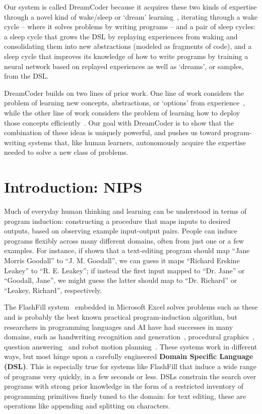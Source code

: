 \documentclass{article}
\begin{document}
Our system is called DreamCoder because it acquires these two kinds of
expertise through a novel kind of wake/sleep or `dream'
learning~\cite{hinton1995wake}, iterating through a wake cycle --
where it solves problems by writing programs -- and a pair of sleep
cycles: a sleep cycle that grows the DSL by replaying experiences from
waking and consolidating them into new abstractions (modeled as
fragments of code), and a sleep cycle that improves its knowledge of
how to write programs by training a neural network based on replayed
experiences as well as `dreams', or samples, from the DSL.

DreamCoder builds on two lines of prior work.  One line of work
considers the problem of learning new concepts, abstractions, or
`options' from
experience~\cite{Dechter:2013:BLV:2540128.2540316,DBLP:conf/icml/LiangJK10,solomonoff1989system,DBLP:journals/corr/abs-1110-5667,stolle2002learning},
while the other line of work considers the problem of learning how to
deploy those concepts
efficiently~\cite{devlin2017robustfill,balog2016deepcoder,NGDS}.  Our
goal with DreamCoder is to show that the combination of these ideas is
uniquely powerful, and pushes us toward program-writing systems that,
like human learners, autonomously acquire the expertise needed to
solve a new class of problems.



\section{Introduction: NIPS}


Much of everyday human thinking and learning can be understood in
terms of program induction: constructing a procedure that maps inputs
to desired outputs, based on observing example input-output pairs.
People can induce programs flexibly across many different domains,
often from just one or a few examples.  For instance, if shown that a
text-editing program should map ``Jane Morris Goodall'' to
``J. M. Goodall'', we can guess it maps ``Richard Erskine Leakey'' to
``R. E. Leakey''; if instead the first input mapped to ``Dr. Jane'' or
``Goodall, Jane'', we might guess the latter should map to
``Dr. Richard'' or ``Leakey, Richard'', respectively.

The FlashFill system~\cite{gulwani2011automating} embedded in
Microsoft Excel solves problems such as these and is probably the best
known practical program-induction algorithm, but researchers in
programming languages and AI have had successes in many domains, such as handwriting recognition and
generation~\cite{lake2015human}, procedural
graphics~\cite{ellis2017learning,DBLP:journals/corr/abs-1804-01118}, question
answering~\cite{johnson2017clevr} and robot motion
planning~\cite{devlin2017neural}.  These systems
work in different ways, but most hinge upon a carefully engineered
\textbf{Domain Specific Language (DSL)}.  This is especially true for
systems like FlashFill that induce a wide range of programs
very quickly, in a few seconds or less.  DSLs constrain the search
over programs with strong prior knowledge in the form of a restricted
inventory of programming primitives finely tuned to the domain: for
text editing, these are operations like appending and
splitting on characters.
\end{document}
